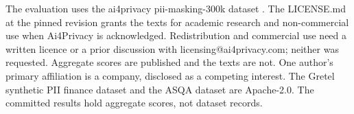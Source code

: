 \documentclass[conference]{IEEEtran}
\begin{document}
The evaluation uses the ai4privacy pii-masking-300k dataset \cite{ai4privacy}. The
LICENSE.md at the pinned revision grants the texts for academic research and
non-commercial use when Ai4Privacy is acknowledged. Redistribution and commercial
use need a written licence or a prior discussion with licensing@ai4privacy.com;
neither was requested. Aggregate scores are published and the texts are not.
One author's primary affiliation is a company, disclosed as a competing interest.
The Gretel synthetic PII finance dataset \cite{gretelfinance} and the ASQA dataset
\cite{asqa} are Apache-2.0. The committed results hold aggregate scores, not dataset records.



\end{document}
